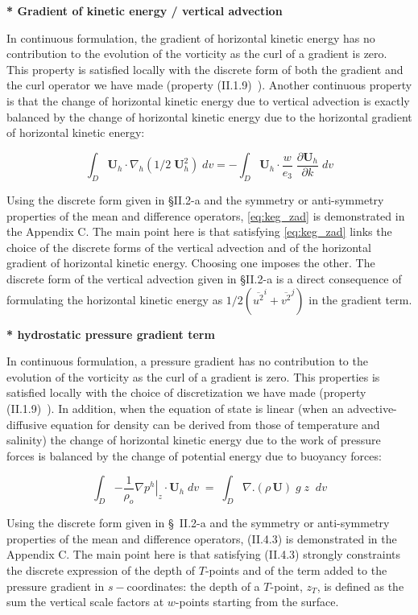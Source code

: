 \documentclass[../main/NEMO_manual]{subfiles}
\begin{document}
\textbf{* Gradient of kinetic energy / vertical advection}

In continuous formulation, the gradient of horizontal kinetic energy has no contribution to the evolution of
the vorticity as the curl of a gradient is zero.
This property is satisfied locally with the discrete form of both the gradient and the curl operator we have made
(property (II.1.9)~).
Another continuous property is that the change of horizontal kinetic energy due to
vertical advection is exactly balanced by the change of horizontal kinetic energy due to
the horizontal gradient of horizontal kinetic energy:

\begin{equation} \label{eq:keg_zad}
\int_D {{\textbf{U}}_h \cdot \nabla _h \left( {1/2\;{\textbf{U}}_h ^2} \right)\;dv} =-\int_D {{\textbf{U}}_h \cdot \frac{w}{e_3 }\;\frac{\partial 
{\textbf{U}}_h }{\partial k}\;dv}
\end{equation}

Using the discrete form given in {\S}II.2-a and the symmetry or anti-symmetry properties of
the mean and difference operators, \autoref{eq:keg_zad} is demonstrated in the Appendix C.
The main point here is that satisfying \autoref{eq:keg_zad} links the choice of the discrete forms of
the vertical advection and of the horizontal gradient of horizontal kinetic energy.
Choosing one imposes the other.
The discrete form of the vertical advection given in {\S}II.2-a is a direct consequence of
formulating the horizontal kinetic energy as $1/2 \left( \overline{u^2}^i + \overline{v^2}^j \right) $ in
the gradient term.

\textbf{* hydrostatic pressure gradient term}

In continuous formulation, a pressure gradient has no contribution to the evolution of the vorticity as
the curl of a gradient is zero.
This properties is satisfied locally with the choice of discretization we have made (property (II.1.9)~).
In addition, when the equation of state is linear
(\ie when an advective-diffusive equation for density can be derived from those of temperature and salinity)
the change of horizontal kinetic energy due to the work of pressure forces is balanced by the change of
potential energy due to buoyancy forces:

\[
  \int_D {-\frac{1}{\rho_o }\left. {\nabla p^h} \right|_z \cdot {\textbf {U}}_h \;dv} \;=\;\int_D {\nabla .\left( {\rho \,{\textbf{U}}} \right)\;g\;z\;\;dv}
\]

Using the discrete form given in {\S}~II.2-a and the symmetry or anti-symmetry properties of
the mean and difference operators, (II.4.3) is demonstrated in the Appendix C.
The main point here is that satisfying (II.4.3) strongly constraints the discrete expression of the depth of 
$T$-points and of the term added to the pressure gradient in $s-$coordinates: the depth of a $T$-point, $z_T$,
is defined as the sum the vertical scale factors at $w$-points starting from the surface.
\end{document}
